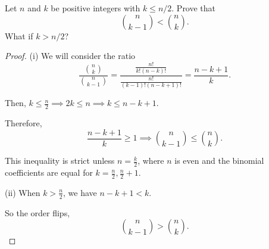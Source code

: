 \documentclass{article}
\begin{document}
Let $n$ and $k$ be positive integers with $k \le n/2$. Prove that
\[
	\binom{n}{k-1} < \binom{n}{k}.
\]
What if $k > n/2$?
\begin{proof} (i)
	We will consider the ratio
	\[
		\frac{\binom{n}{k}}{\binom{n}{k-1}}=\frac{\frac{n!}{k!(n-k)!}}{\frac{n!}{(k-1)!(n-k+1)!}}=\frac{n-k+1}{k}
		.\]

	Then, $k\le \frac{n}{2} \implies 2k\le n \implies k\le n-k+1$.

	Therefore,
	\[
		\frac{n-k+1}{k}\ge 1 \implies  \binom{n}{k-1} \le \binom{n}{k}
		.\]

	This inequality is strict unless $n=\frac{k}{2}$, where $n$ is even and the binomial coefficients are equal for  $k=\frac{n}{2},\frac{n}{2} + 1$.

	(ii)
	When $k>\frac{n}{2}$, we have $n-k+1<k$.

	So the order flips,
	\[
		\binom{n}{k-1}>\binom{n}{k}
		.\]
\end{proof}
\end{document}
